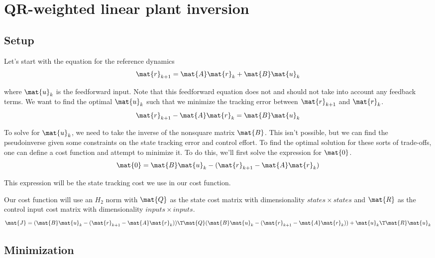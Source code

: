 \section{QR-weighted linear plant inversion}

\subsection{Setup}

Let's start with the equation for the \gls{reference} dynamics
\begin{equation*}
  \mat{r}_{k+1} = \mat{A}\mat{r}_k + \mat{B}\mat{u}_k
\end{equation*}

where $\mat{u}_k$ is the feedforward input. Note that this feedforward equation
does not and should not take into account any feedback terms. We want to find
the optimal $\mat{u}_k$ such that we minimize the \gls{tracking} error between
$\mat{r}_{k+1}$ and $\mat{r}_k$.
\begin{equation*}
  \mat{r}_{k+1} - \mat{A}\mat{r}_k = \mat{B}\mat{u}_k
\end{equation*}

To solve for $\mat{u}_k$, we need to take the inverse of the nonsquare matrix
$\mat{B}$. This isn't possible, but we can find the pseudoinverse given some
constraints on the \gls{state} \gls{tracking} error and \gls{control effort}. To
find the optimal solution for these sorts of trade-offs, one can define a cost
function and attempt to minimize it. To do this, we'll first solve the
expression for $\mat{0}$.
\begin{equation*}
  \mat{0} = \mat{B}\mat{u}_k - (\mat{r}_{k+1} - \mat{A}\mat{r}_k)
\end{equation*}

This expression will be the \gls{state} \gls{tracking} cost we use in our cost
function.

Our cost function will use an $H_2$ norm with $\mat{Q}$ as the \gls{state} cost
matrix with dimensionality $states \times states$ and $\mat{R}$ as the
\gls{control input} cost matrix with dimensionality $inputs \times inputs$.
\begin{equation*}
  \mat{J} = (\mat{B}\mat{u}_k - (\mat{r}_{k+1} - \mat{A}\mat{r}_k))\T \mat{Q}
    (\mat{B}\mat{u}_k - (\mat{r}_{k+1} - \mat{A}\mat{r}_k)) +
    \mat{u}_k\T\mat{R}\mat{u}_k
\end{equation*}

\subsection{Minimization}

